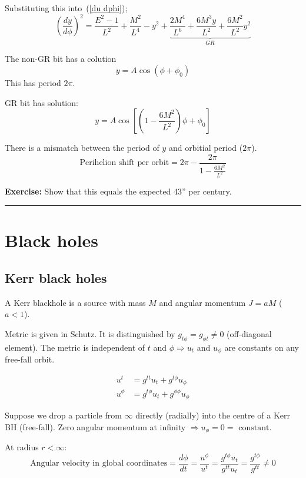 \documentclass[a4paper]{article} %
\newcommand{\exercise}[2]
{
\begin{framed}
\textbf{Exercise:} #1 \\\hrule
#2
\end{framed}
}
\begin{document}
Substituting this into~(\ref{du dphi});
\begin{equation}
\left(\frac{dy}{d\phi}\right)^2=\frac{E^2-1}{L^2}+\frac{M^2}{L^4}-y^2
+\underbrace{\frac{2M^4}{L^6}+\frac{6M^3 y}{L^2}+\frac{6M^2}{L^2}y^2}_{GR}
\end{equation}

The non-GR bit has a colution
\begin{equation}
y=A\cos(\phi+\phi_0)
\end{equation}
This has period $2\pi$.

GR bit has solution:
\begin{equation}
y=A\cos\left[\left(1-\frac{6M^2}{L^2}\right)\phi + \phi_0\right]
\end{equation}

There is a mismatch between the period of $y$ and orbitial period ($2\pi$).
\begin{equation}
\text{Perihelion shift per orbit}=2\pi - \frac{2\pi}{1-\frac{6M^2}{L^2}}
\end{equation}

\exercise{Show that this equals the expected 43'' per century.}{}


\section{Black holes}
\subsection{Kerr black holes}


A Kerr blackhole is a source with mass $M$ and angular momentum $J=aM$ ($a< 1$).

Metric is given in Schutz. It is distinguished by $g_{t\phi}=g_{\phi t}\neq 0$ (off-diagonal element). The metric is independent of $t$ and $\phi \Rightarrow u_t$ and $u_{\phi}$ are constants on any free-fall orbit.

\begin{align}
u^t&=g^{tt} u_t + g^{t\phi}u_{\phi}\\
u^{\phi}&= g^{t\phi}u_t + g^{\phi\phi} u_{\phi}
\end{align}

Suppose we drop a particle from $\infty$ directly (radially) into the centre of a Kerr BH (free-fall). Zero angular momentum at infinity $\Rightarrow u_{\phi}=0=\text{ constant}$.

At radius $r<\infty$:
\begin{equation}
\text{Angular velocity in global coordinates}=\frac{d\phi}{dt}=\frac{u^{\phi}}{u^t}
=\frac{g^{t\phi}u_t}{g^{tt}u_t}=\frac{g^{t\phi}}{g^{tt}}\neq 0
\end{equation}
\end{document}
